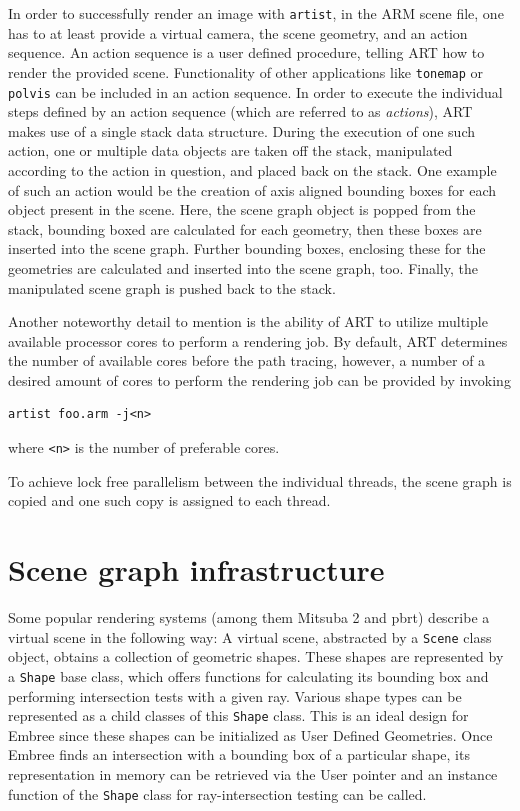 In order to successfully render an image with \texttt{artist}, in the ARM scene file, one has to at least provide a virtual camera, the scene geometry, and an action sequence. An action sequence is a user defined procedure, telling ART how to render the provided scene. Functionality of other applications like \texttt{tonemap} or \texttt{polvis} can be included in an action sequence.
In order to execute the individual steps  defined by an action sequence (which are referred to as \emph{actions}), ART makes use of a single stack data structure. During the execution of one such action, one or multiple data objects are taken off the stack, manipulated according to the action in question, and placed back on the stack. One example of such an action would be the creation of axis aligned bounding boxes for each object present in the scene. Here, the scene graph object is popped from the stack, bounding boxed are calculated for each geometry, then these boxes are inserted into the scene graph. Further bounding boxes, enclosing these for the geometries are calculated and inserted into the scene graph, too. Finally, the manipulated scene graph is pushed back to the stack.

Another noteworthy detail to mention is the ability of ART to utilize multiple available processor cores to perform a rendering job. By default, ART determines the number of available cores before the path tracing, however, a number of a desired amount of cores to perform the rendering job can be provided by invoking

\begin{Verbatim}
artist foo.arm -j<n>
\end{Verbatim}

where \texttt{<n>} is the number of preferable cores.

To achieve lock free parallelism between the individual threads, the scene graph is copied and one such copy is assigned to each thread. 
 

\section{Scene graph infrastructure}
Some popular rendering systems (among them Mitsuba 2 and pbrt) describe a virtual scene in the following way: A virtual scene, abstracted by a \texttt{Scene} class object, obtains a collection of geometric shapes. These shapes are represented by a \texttt{Shape} base class, which offers functions for calculating its bounding box and performing intersection tests with a given ray. Various shape types can be represented as a child classes of this \texttt{Shape} class. This is an ideal design for Embree since these shapes can be initialized as User Defined Geometries. Once Embree finds an intersection with a bounding box of a particular shape, its representation in memory can be retrieved via the User pointer  and an instance function of the \texttt{Shape} class for ray-intersection testing can be called. 

